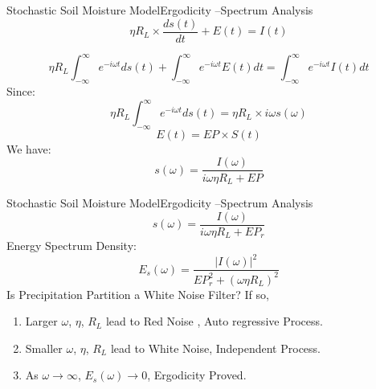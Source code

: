 \documentclass[10pt]{beamer}
\begin{document}
\begin{frame}{Stochastic Soil Moisture Model}{Ergodicity --Spectrum Analysis}
\begin{equation*}
\label{dsbalance}
\eta R_L \times \frac{ds(t)}{dt}+E(t)=I(t)
\end{equation*} 
 
\begin{equation*}
\label{fourierch}
\eta R_L \int_{-\infty}^{\infty}e^{-i\omega t}ds(t)+\int_{-\infty}^{\infty}e^{-i\omega t}E(t)dt=\int_{-\infty}^{\infty}e^{-i\omega t}I(t)dt 
\end{equation*} 
Since:
\begin{equation*}
\eta R_L \int_{-\infty}^{\infty}e^{-i \omega t}ds(t)=\eta R_L \times i\omega s(\omega)
\end{equation*}
\begin{equation*}
E(t)=EP \times S(t)
\end{equation*}
We have: 
\begin{equation*}
\label{F}
s(\omega )=\frac{I(\omega )}{i\omega \eta R_L+EP}
\end{equation*}

\end{frame}

\begin{frame}{Stochastic Soil Moisture Model}{Ergodicity --Spectrum Analysis}
\begin{equation*}
\label{F}
s(\omega )=\frac{I(\omega )}{i\omega \eta R_L+EP_r}
\end{equation*}
Energy Spectrum Density:
\begin{equation*}
E_s (\omega)=\frac{|I(\omega)|^2}{EP_r ^2+(\omega \eta R_L) ^2}
\label{sssss}
\end{equation*}
 Is Precipitation Partition a \textcolor[rgb]{1,0,0}{White Noise Filter}? If so, 
\begin{enumerate}
\item  Larger $\omega$, $\eta$, $R_L$ lead to \textcolor[rgb]{1,0,0}{Red Noise , Auto regressive Process}. 
\item Smaller $\omega$, $\eta$, $R_L$ lead to \textcolor[rgb]{1,0,0}{White Noise, Independent Process}.
\item As $\omega \rightarrow \infty$, $E_s (\omega) \rightarrow 0$, Ergodicity Proved.
\end{enumerate}
\end{frame}
 
\end{document}
